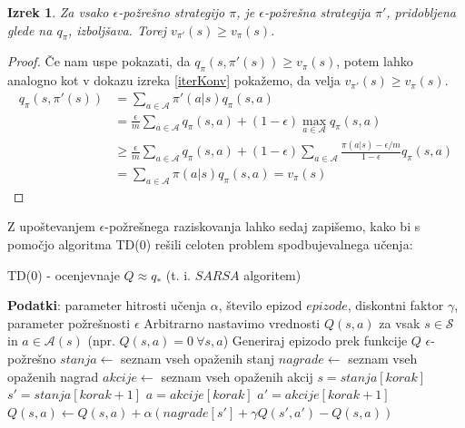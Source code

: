 \documentclass[12pt,a4paper]{amsart}
\theoremstyle{definition} %
\theoremstyle{plain} %
\newtheorem{izrek}[definicija]{Izrek}
\begin{document}
\begin{izrek}
    Za vsako $\epsilon$-požrešno strategijo $\pi$, je $\epsilon$-požrešna strategija $\pi'$, 
    pridobljena glede na $q_\pi$, izboljšava. Torej $v_{\pi'}(s) \geq v_\pi(s)$. 
\end{izrek}

\begin{proof}
    Če nam uspe pokazati, da $q_\pi(s, \pi'(s)) \geq v_\pi(s)$, potem lahko analogno kot v dokazu izreka 
    \ref{iterKonv} pokažemo, da velja $v_{\pi'}(s) \geq v_\pi(s)$.
    \begin{align*}
        q_\pi(s, \pi'(s)) &= \sum_{a \in \mathcal{A}} \pi'(a|s) q_\pi(s, a) \\
        &= \frac{\epsilon}{m} \sum_{a \in \mathcal{A}} q_\pi(s, a) + (1 - \epsilon) \max_{a \in 
            \mathcal{A}} q_\pi(s, a) \\
        &\geq \frac{\epsilon}{m} \sum_{a \in \mathcal{A}} q_\pi(s, a) + (1 - \epsilon) \sum_{a \in \mathcal{A}} 
            \frac{\pi(a|s) - \epsilon / m}{1 - \epsilon} q_\pi(s, a) \\
        &= \sum_{a \in \mathcal{A}} \pi(a|s) q_\pi(s, a) = v_\pi(s)
    \end{align*}
\end{proof}

Z upoštevanjem $\epsilon$-požrešnega raziskovanja lahko sedaj zapišemo, kako bi s pomočjo algoritma 
TD($0$) rešili celoten problem spodbujevalnega učenja:

\begin{algorithm}[H]
    \caption{TD($0$) - ocenjevnaje  $Q \approx q_*$ (t. i. $SARSA$ algoritem)}
\begin{algorithmic}\label{SARSA}
    
    \STATE \textbf{Podatki}: parameter hitrosti učenja $\alpha$, število epizod $epizode$, diskontni 
            faktor $\gamma$, parameter požrešnosti $\epsilon$
    \STATE 
    \STATE Arbitrarno nastavimo vrednosti $Q(s, a)$ za vsak $s \in \mathcal{S}$ in $a \in \mathcal{A}(s)$ 
            (npr. $Q(s, a) = 0~\forall s, a$)
    \STATE
        \STATE Generiraj epizodo prek funkcije $Q$ $\epsilon$-požrešno
        \STATE $stanja \leftarrow$ seznam vseh opaženih stanj
        \STATE $nagrade \leftarrow$ seznam vseh opaženih nagrad
        \STATE $akcije \leftarrow$ seznam vseh opaženih akcij
        \STATE
        \STATE $s = stanja[korak]$
        \STATE $s' = stanja[korak + 1]$
        \STATE $a = akcije[korak]$
        \STATE $a' = akcije[korak + 1]$
        \STATE $Q(s, a) \leftarrow Q(s, a) + \alpha (nagrade[s'] + \gamma Q(s', a') - Q(s, a))$ 
        \ENDFOR
    \ENDFOR

\end{algorithmic}
\end{algorithm}
\end{document}
